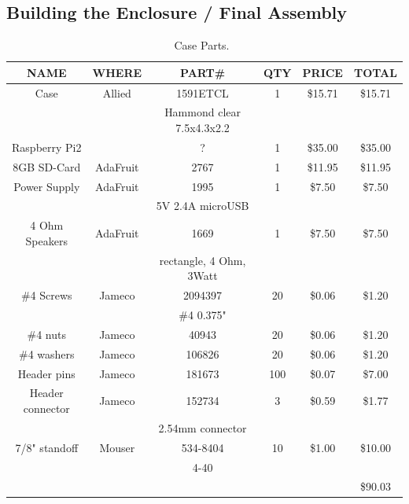 \documentclass[11pt]{article}
\begin{document}
\subsection{Building the Enclosure / Final Assembly}


\begin{table}

\caption{Case Parts.~\label{table:case_parts}}
\centering
\begin{tabular}{|c|c|c|c|c|c|}
\hline
NAME		& WHERE		& PART\#	           & QTY & PRICE    & TOTAL \\
\hline
\hline
Case		& Allied	& 1591ETCL		   & 1   & \$15.71   & \$15.71 \\
		&		& Hammond clear 7.5x4.3x2.2&     &           &         \\
\hline
Raspberry Pi2	&		&		?	   & 1   & \$35.00   & \$35.00 \\
\hline
8GB SD-Card	& AdaFruit	& 2767			   & 1   & \$11.95   & \$11.95 \\
\hline
Power Supply	& AdaFruit	& 1995			   & 1   & \$7.50    & \$7.50  \\
		&		& 5V 2.4A microUSB	   &     &           &         \\
\hline
4 Ohm Speakers	& AdaFruit	& 1669			   & 1	 & \$7.50    & \$7.50  \\ 
		&		& rectangle, 4 Ohm, 3Watt  &     &           &         \\
\hline
\#4 Screws	& Jameco	& 2094397	  	   & 20  & \$0.06   & \$1.20  \\
		&		& \#4 0.375"		   &     &          &         \\
\hline
\#4 nuts	& Jameco	& 40943	   	           & 20  & \$0.06   & \$1.20  \\
\hline
\#4 washers	& Jameco	& 106826	   	   & 20  & \$0.06   & \$1.20  \\
\hline
Header pins	& Jameco	& 181673	           & 100 & \$0.07   & \$7.00  \\
\hline
Header connector& Jameco	& 152734	           & 3   & \$0.59   & \$1.77  \\
		&		& 2.54mm connector	   &     &          &         \\
\hline
7/8" standoff	& Mouser	& 534-8404		   & 10  & \$1.00   & \$10.00   \\
		&		& 4-40			   &     &          &          \\
\hline
\hline
		&		&		&	&		& \$90.03 \\
\hline
\end{tabular}
\end{table}
\end{document}
